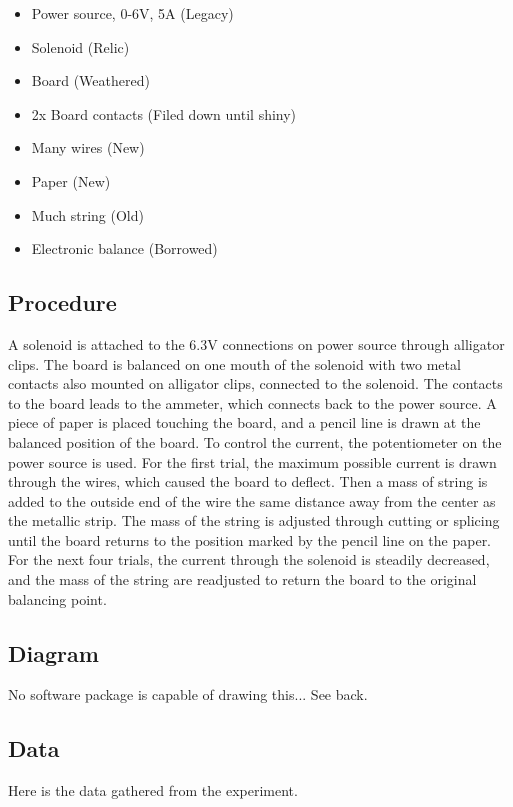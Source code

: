 \documentclass[11pt]{report}
\begin{document}
\begin{itemize}
\item Power source, 0-6V, 5A (Legacy)
\item Solenoid (Relic)
\item Board (Weathered)
\item 2x Board contacts (Filed down until shiny)
\item Many wires (New)
\item Paper (New)
\item Much string (Old)
\item Electronic balance (Borrowed)
\end{itemize}

\subsection{Procedure}
A solenoid is attached to the 6.3V connections on power source through alligator clips. The board is balanced on one mouth of the solenoid with two metal contacts also mounted on alligator clips, connected to the solenoid. The contacts to the board leads to the ammeter, which connects back to the power source. A piece of paper is placed touching the board, and a pencil line is drawn at the balanced position of the board. To control the current, the potentiometer on the power source is used. For the first trial, the maximum possible current is drawn through the wires, which caused the board to deflect. Then a mass of string is added to the outside end of the wire the same distance away from the center as the metallic strip. The mass of the string is adjusted through cutting or splicing until the board returns to the position marked by the pencil line on the paper. For the next four trials, the current through the solenoid is steadily decreased, and the mass of the string are readjusted to return the board to the original balancing point.

\subsection{Diagram}
No software package is capable of drawing this... See back.

\subsection{Data}
Here is the data gathered from the experiment.
\end{document}
